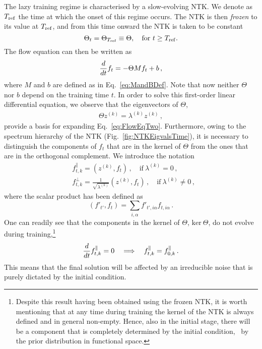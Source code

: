The lazy training regime is characterised by a slow-evolving NTK. We denote as
$T_{\rm ref}$ the time at which the onset of this regime occurs. The NTK is then
\textit{frozen} to its value at $T_{\rm ref}$, and from this time onward the NTK
is taken to be constant
\begin{equation}
  \Theta_t = \Theta_{T_{\rm ref}} \equiv \Theta, \quad \textrm{for } t \geq T_{\rm ref}.
\end{equation} 
The flow equation can then be written as
\begin{align}
  \frac{d}{dt} f_t = -\Theta M f_t + b\, ,
  \label{eq:FlowEqTwo}
\end{align}
where $M$ and $b$ are defined as in Eq.~\eqref{eq:MandBDef}. Note that now
neither $\Theta$ nor $b$ depend on the training time $t$. In order to solve this
first-order linear differential equation, we observe that the eigenvectors of
$\Theta$,
\begin{align}
    \label{eq:ThetaEigensystem}
    \Theta z^{(k)} = \lambda^{(k)} z^{(k)}\, ,
\end{align}
provide a basis for expanding Eq.~\eqref{eq:FlowEqTwo}. Furthermore, owing to
the spectrum hierarchy of the NTK (Fig.~\ref{fig:NTKEigvalsTime}), it is
necessary to distinguish the components of $f_t$ that are in the kernel of
$\Theta$ from the ones that are in the orthogonal complement. We introduce the
notation
\begin{align}
    \label{eq:ParallelCompnents}
    &f^\parallel_{t,k} = \left(z^{(k)}, f_t\right)\, , \quad \text{if}\ \lambda^{(k)} = 0\, , \\
    \label{eq:OrthogonalComponents}
    &f^\perp_{t,k} = \frac{1}{\sqrt{\lambda^{(k)}}} \left(z^{(k)}, f_t\right)\, , \quad
        \text{if}\ \lambda^{(k)} \neq 0\, ,
\end{align}
where the scalar product has been defined as
\begin{equation}
  \left(f'_{t'}, f_t\right) = \sum_{i,\alpha} f'_{t',i\alpha} f_{t,i\alpha}\,.
\end{equation}
One can readily see that the components in the kernel of $\Theta$, $\text{ker}\
\Theta$, do not evolve during training,\footnote{Despite this result having been
obtained using the frozen NTK, it is worth mentioning that at any time during
training the kernel of the NTK is always defined and in general non-empty.
Hence, also in the initial stage, there will be a component that is completely
determined by the initial condition, \ie\ by the prior distribution in functional
space.}
\begin{align}
    \label{eq:FlowParallel}
    \frac{d}{dt} f^\parallel_{t,k} = 0
        \quad \Longrightarrow \quad f^\parallel_{t,k} = f^\parallel_{0,k}\, .
\end{align}
This means that the final solution will be affected by an irreducible noise that
is purely dictated by the initial condition. 


